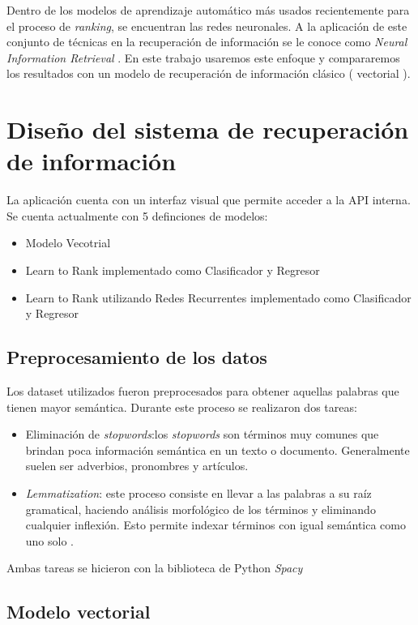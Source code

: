 \documentclass[12pt]{article}
\begin{document}
Dentro de los modelos de aprendizaje automático más usados recientemente para el proceso de \textit{ranking}, se encuentran las redes neuronales. A la aplicación de este conjunto de técnicas en la recuperación de información se le 
conoce como \textit{Neural Information Retrieval} \cite{mitra2018an}. En este trabajo usaremos este enfoque y compararemos los resultados
con un modelo de recuperación de información clásico ( vectorial ).


\section{Diseño del sistema de recuperación de información}

La aplicación cuenta con un interfaz visual que permite acceder a la API interna. Se cuenta actualmente con 5 definciones de modelos:
\begin{itemize}
    \item Modelo Vecotrial
    \item Learn to Rank implementado como Clasificador y Regresor
    \item Learn to Rank utilizando Redes Recurrentes implementado como Clasificador y Regresor
\end{itemize}


\subsection{Preprocesamiento de los datos}

Los dataset utilizados fueron preprocesados para obtener aquellas
palabras que tienen mayor semántica. Durante este proceso se
realizaron dos tareas:

\begin{itemize}
	\item Eliminación de \textit{stopwords}:los \textit{stopwords} son
		términos muy comunes que brindan poca información semántica
		en un texto o documento. Generalmente suelen ser adverbios,
		pronombres y artículos.
	\item \textit{Lemmatization}: este proceso consiste en llevar a las
		palabras a su raíz gramatical, haciendo análisis morfológico 
		de los términos y eliminando cualquier inflexión. Esto permite
		indexar términos con igual semántica como uno solo .
\end{itemize}

Ambas tareas se hicieron con la biblioteca de Python \textit{Spacy}

\subsection{Modelo vectorial}
\end{document}

